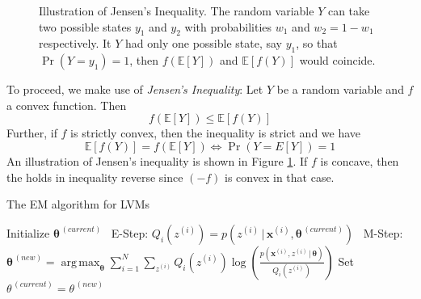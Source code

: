\documentclass[final,3p,times,twocolumn]{elsarticle}
\DeclareMathOperator*{\argmax}{arg\,max}
\let\bs\boldsymbol
\begin{document}
\begin{figure}
\caption{Illustration of Jensen's Inequality.
The random variable $Y$ can take two possible states $y_1$ and $y_2$ with probabilities $w_1$ and $w_2=1-w_1$ respectively.
It $Y$ had only one possible state, say $y_1$, so that $\Pr(Y=y_1)=1$, then $f\left(\mathbb{E}[Y]\right)$ and $\mathbb{E}\left[f(Y)\right]$ would coincide.
}
\label{fig:jensen}
\end{figure}

To proceed, we make use of \emph{Jensen's Inequality}:
Let $Y$ be a random variable and $f$ a convex function. Then
\begin{equation}
f\left(\mathbb{E}[Y]\right) \leq \mathbb{E}\left[f(Y)\right]
\label{eqn:jensen}
\end{equation}
Further, if $f$ is strictly convex, then the inequality is strict and we have
\begin{equation}
\mathbb{E}\left[f(Y)\right] = f\left(\mathbb{E}[Y]\right) \iff \Pr\left(Y = E[Y]\right) = 1
\label{eqn:jensentight}
\end{equation}
An illustration of Jensen's inequality is shown in Figure \ref{fig:jensen}.
If $f$ is concave, then the holds in inequality reverse since $(-f)$ is convex in that case. 

\begin{algorithm}
\caption{The EM algorithm for LVMs}
\label{alg:EM}
\begin{algorithmic}[1]
\State Initialize $\bs\theta^{\,(current)}$
\Statex\Repeat
\Statex \quad\, E-Step:
\State $Q_i(z^{(i)}) = p(z^{(i)}\,|\,\bs x^{(i)},\bs\theta^{\,(current)})$
\EndFor
\Statex\Statex \quad\, M-Step:
\State $\bs\theta^{\,(new)} = \argmax_{\bs\theta}\sum_{i=1}^N \sum_{z^{(i)}} Q_i(z^{(i)}) \log \left( \frac{p(\bs x^{(i)},z^{(i)}\,|\,\bs\theta)}{Q_i(z^{(i)})}\right)$
\State Set $\theta^{\,(current)} = \theta^{\,(new)}$
\Statex\State\Return{  $\bs\theta^{\,(current)},z^{(1)}, \dots, z^{(N)}$}
\end{algorithmic}
\end{algorithm}
\end{document}
